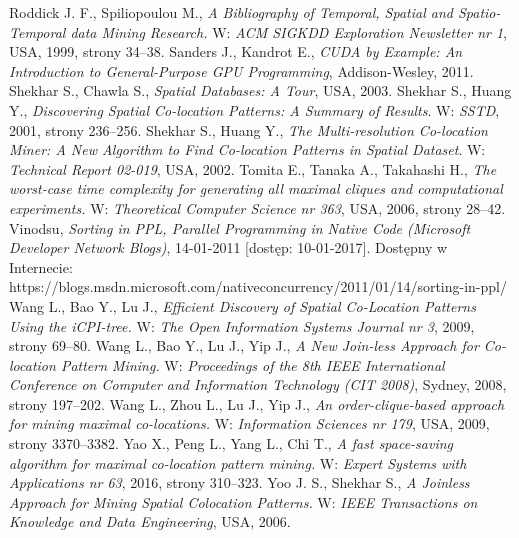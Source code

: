 \documentclass[12pt]{article}
\begin{document}
\begin{thebibliography}{}
Roddick J. F., Spiliopoulou M., \textit{A Bibliography of Temporal, Spatial and Spatio-Temporal data Mining Research.} W: \textit{ACM SIGKDD Exploration Newsletter nr 1}, USA, 1999, strony 34–38.
Sanders J., Kandrot E., \textit{CUDA by Example: An Introduction to General-Purpose GPU Programming}, Addison-Wesley, 2011.
Shekhar S., Chawla S., \textit{Spatial Databases: A Tour}, USA, 2003.
Shekhar S., Huang Y., \textit{Discovering Spatial Co-location Patterns: A Summary of Results}. W: \textit{SSTD}, 2001, strony 236–256.
Shekhar S., Huang Y., \textit{The Multi-resolution Co-location Miner: A New Algorithm to Find Co-location Patterns in Spatial Dataset}. W: \textit{Technical Report 02-019}, USA, 2002.
Tomita E., Tanaka A., Takahashi H., \textit{The worst-case time complexity for generating all maximal cliques and computational experiments.} W: \textit{Theoretical Computer Science nr 363}, USA, 2006, strony 28–42.
Vinodsu, \textit{Sorting in PPL, Parallel Programming in Native Code (Microsoft Developer Network Blogs)}, 14-01-2011 [dostęp: 10-01-2017]. Dostępny w Internecie: https://blogs.msdn.microsoft.com/nativeconcurrency/2011/01/14/sorting-in-ppl/
Wang L., Bao Y., Lu J., \textit{Efficient Discovery of Spatial Co-Location Patterns Using the iCPI-tree.} W: \textit{The Open Information Systems Journal nr 3}, 2009, strony 69–80.
Wang L., Bao Y., Lu J., Yip J., \textit{A New Join-less Approach for Co-location Pattern Mining.} W: \textit{Proceedings of the 8th IEEE International Conference on Computer and Information Technology (CIT 2008)}, Sydney, 2008, strony 197–202.
Wang L., Zhou L., Lu J., Yip J., \textit{An order-clique-based approach for mining maximal co-locations.} W: \textit{Information Sciences nr 179}, USA, 2009, strony 3370–3382.
Yao X., Peng L., Yang L., Chi T.,\textit{ A fast space-saving algorithm for maximal co-location pattern mining.} W: \textit{Expert Systems with Applications nr 63}, 2016, strony 310–323.
Yoo J. S., Shekhar S., \textit{A Joinless Approach for Mining Spatial Colocation Patterns.} W: \textit{IEEE Transactions on Knowledge and Data Engineering}, USA, 2006.
\end{thebibliography}
\end{document}
